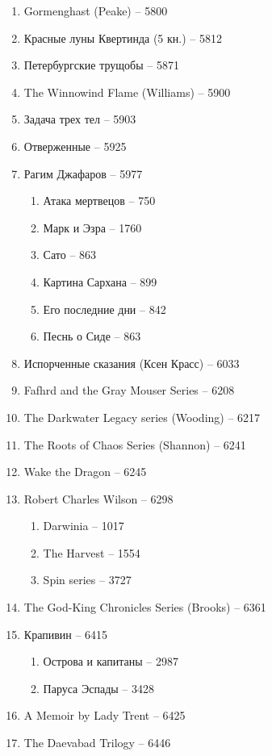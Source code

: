 \documentclass[a4paper, 11pt]{proc} %
\begin{document}
\begin{enumerate}
    \item Gormenghast (Peake) -- 5800
    \item Красные луны Квертинда (5 кн.) -- 5812
    \item Петербургские трущобы -- 5871
    \item The Winnowind Flame (Williams) -- 5900
    \item Задача трех тел -- 5903
    \item Отверженные -- 5925
    \item Рагим Джафаров -- 5977
        \begin{enumerate}
            \item Атака мертвецов -- 750
            \item Марк и Эзра -- 1760
            \item Сато -- 863
            \item Картина Сархана -- 899
            \item Его последние дни -- 842
            \item Песнь о Сиде -- 863
        \end{enumerate}
    \item Испорченные сказания (Ксен Красс) -- 6033
    \item Fafhrd and the Gray Mouser Series -- 6208
    \item The Darkwater Legacy series (Wooding) -- 6217
    \item The Roots of Chaos Series (Shannon) -- 6241
    \item Wake the Dragon -- 6245
    \item Robert Charles Wilson -- 6298
        \begin{enumerate}
            \item Darwinia -- 1017
            \item The Harvest -- 1554
            \item Spin series -- 3727
        \end{enumerate}
    \item The God-King Chronicles Series (Brooks) -- 6361
    \item Крапивин -- 6415
        \begin{enumerate}
            \item Острова и капитаны -- 2987
            \item Паруса Эспады -- 3428
        \end{enumerate}
    \item A Memoir by Lady Trent -- 6425
    \item The Daevabad Trilogy -- 6446

\end{enumerate}
\end{document}

